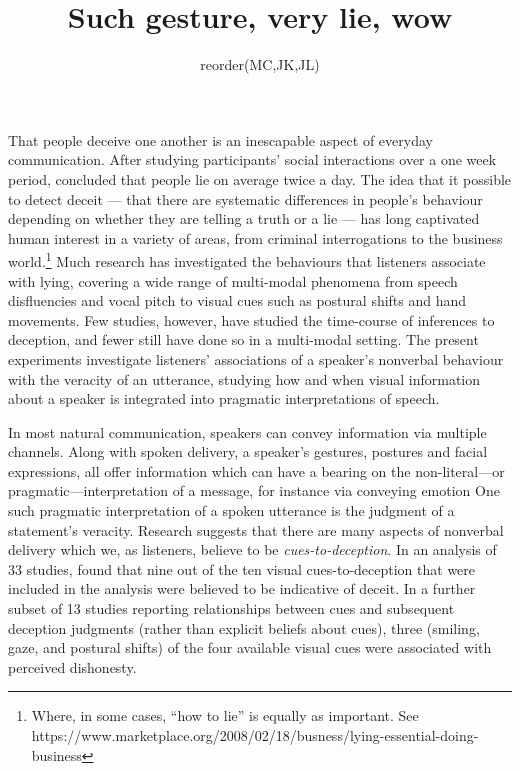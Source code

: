 \documentclass[a4paper,man,natbib]{apa6}
\title{Such gesture, very lie, wow}
\author{reorder(MC,JK,JL)}
\affiliation{Psychology, PPLS, University of Edinburgh}
\newcommand*{\term}[1]{\emph{#1}} %
\begin{document}



\maketitle
\linenumbers
\noindent
That people deceive one another is an inescapable aspect of everyday communication.
After studying participants' social interactions over a one week period, \citet{DePaulo1996} concluded that people lie on average twice a day.
The idea that it possible to detect deceit --- that there are systematic differences in people's behaviour depending on whether they are telling a truth or a lie --- has long captivated human interest in a variety of areas, from criminal interrogations to the business world.\footnote{Where, in some cases, ``how to lie'' is equally as important. See https://www.marketplace.org/2008/02/18/busness/lying-essential-doing-business}
Much research has investigated the behaviours that listeners associate with lying, covering a wide range of multi-modal phenomena from speech disfluencies and vocal pitch to visual cues such as postural shifts and hand movements.
Few studies, however, have studied the time-course of inferences to deception, and fewer still have done so in a multi-modal setting.
The present experiments investigate listeners' associations of a speaker's nonverbal behaviour with the veracity of an utterance, studying how and when visual information about a speaker is integrated into pragmatic interpretations of speech.

In most natural communication, speakers can convey information via multiple channels.
Along with spoken delivery, a speaker's gestures, postures and facial expressions, all offer information which can have a bearing on the non-literal---or pragmatic---interpretation of a message, for instance via conveying emotion \citep{Busso2004, Gregerson2005}
One such pragmatic interpretation of a spoken utterance is the judgment of a statement's veracity.
Research suggests that there are many aspects of nonverbal delivery which we, as listeners, believe to be \term{cues-to-deception}. 
In an analysis of 33 studies, \citet{Zuckerman1981} found that nine out of the ten visual cues-to-deception that were included in the analysis were believed to be indicative of deceit. 
In a further subset of 13 studies reporting relationships between cues and subsequent deception judgments (rather than explicit beliefs about cues), three (smiling, gaze, and postural shifts) of the four available visual cues were associated with perceived dishonesty.
\end{document}
